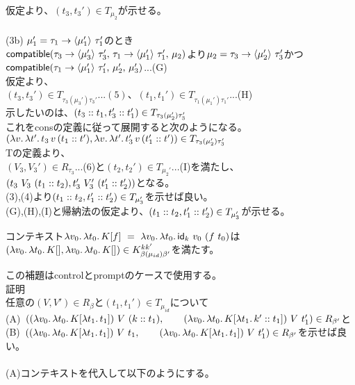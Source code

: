 仮定より、$(t_3,t_3')\in T_{\mu_2}$が示せる。\\
\\
(3b) $\mu_1'=\Trail{\tau_1}{\tau_1'}{\mu_1'}$のとき\\
$\Compatible{\Trail{\tau_3}{\tau_3'}{\mu_3'}}{\Trail{\tau_1}{\tau_1'}{\mu_1'}}{\mu_2}$より$\mu_2 = \Trail{\tau_3}{\tau_3'}{\mu_2'}$かつ$\Compatible{\Trail{\tau_1}{\tau_1'}{\mu_1'}}{\mu_2'}{\mu_3'}$...(G)\\
仮定より、\\
$(t_3, t_3')\in T_{\tau_3(\mu_3')\tau_3'}...(5)、(t_1, t_1')\in T_{\tau_1(\mu_1')\tau_1'}$...(H)\\
示したいのは、$(\Cons{t_3}{t_1}, \Cons{t_3'}{t_1'})\in T_{\tau_3(\mu_2')\tau_3'}$\\これを\textsf{cons}の定義に従って展開すると次のようになる。\\
$(\Lam{v}{\Lam{t'}{t_3\,v\,(\Cons{t_1}{t'})}}, \Lam{v}{\Lam{t'}{t_3'\,v\,(\Cons{t_1'}{t'})}})\in T_{\tau_3(\mu_2')\tau_3'}$\\
Tの定義より、\\
$(V_3,V_3')\in R_{\tau_3}$...(6)と$(t_2,t_2')\in T_{\mu_2'}$...(I)を満たし、$(t_3\ V_3\ (\Cons{t_1}{t_2}),t_3'\ V_3'\ (\Cons{t_1'}{t_2'}))$となる。\\
(3),(4)より$(\Cons{t_1}{t_2},\Cons{t_1'}{t_2'})\in T_{\mu_3'}$を示せば良い。\\
(G),(H),(I)と帰納法の仮定より、$(\Cons{t_1}{t_2},\Cons{t_1'}{t_2'})\in T_{\mu_3'}$が示せる。
\\
\setcounter{definition}{9}
\begin{lemma}
  コンテキスト$\Lam{v_0}{\Lam{t_0}{K[f]}}\ =\ \Lam{v_0}{\Lam{t_0}{\Idk\ v_0\ (f\ t_0)}}$は$(\Lam{v_0}{\Lam{t_0}{K[]}}, \Lam{v_0}{\Lam{t_0}{K[]}})\in  K^{kk'}_{\beta(\mu_{id})\beta'}$を満たす。
\label{IdkContext}
\end{lemma}
この補題はcontrolとpromptのケースで使用する。
\\
\lbrack 証明 \rbrack\\
任意の$(V,V')\in R_{\beta}$と$(t_1,t_1')\in T_{\mu_{id}}$について\\
(A)\ $(\LamP{v_0}{\Lam{t_0}{K[\Lam{t_1}{t_1}]}}\ V\ (\Cons{k}{t_1}),
\qquad \LamP{v_0}{\Lam{t_0}{K[\Lam{t_1}{\Cons{k'}{t_1}}]}}\ V\ t_1')\in R_{\beta'}$と\\
(B)\ $(\LamP{v_0}{\Lam{t_0}{K[\Lam{t_1}{t_1}]}}\ V\ t_1,
\qquad \LamP{v_0}{\Lam{t_0}{K[\Lam{t_1}{t_1}]}}\ V\ t_1')\in R_{\beta'}$を示せば良い。\\
\\
(A)コンテキストを代入して以下のようにする。\\
